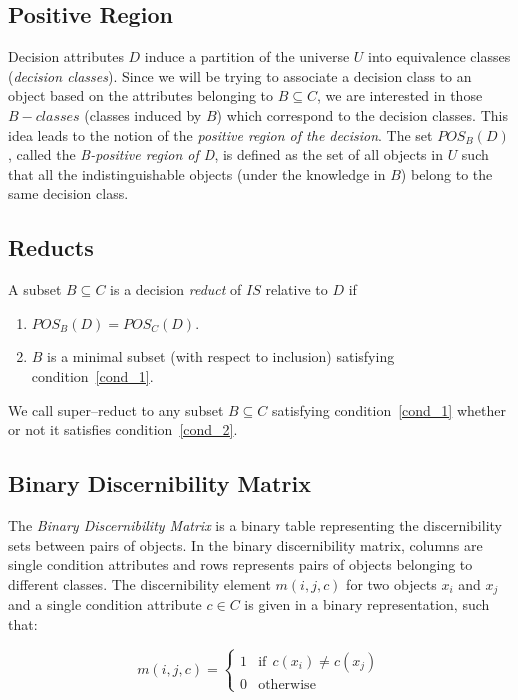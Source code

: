 \documentclass[number,preprint,review,12pt]{elsarticle}
\begin{document}
\subsection{Positive Region}\label{subsect_Pos}
  Decision attributes $D$ induce a partition of the universe $U$ into equivalence classes (\textit{decision classes}). Since we will be trying to associate a decision class to an object based on the attributes belonging to $B \subseteq C$, we are interested in those $B-classes$ (classes induced by $B$) which correspond to the decision classes. This idea leads to the notion of the  \textit{positive region of the decision}. The set $POS_B(D)$, called the \textit{B-positive region of D}, is defined as the set of all objects in $U$ such that all the indistinguishable objects (under the knowledge in $B$) belong to the same decision class.
 
\subsection{Reducts}\label{def_reduct}
  A subset $B \subseteq C$ is a decision \textit{reduct} of $IS$ relative to $D$ if
  \begin{enumerate}
  	\item $POS_B(D)=POS_C(D)$. \label{cond_1}
  	\item $B$ is a minimal subset (with respect to inclusion) satisfying condition~\ref{cond_1}.\label{cond_2}
  \end{enumerate}

  We call super--reduct to any subset $B \subseteq C$ satisfying condition~\ref{cond_1} whether or not it satisfies
  condition~\ref{cond_2}.
  
%  
\subsection{Binary Discernibility Matrix}
  The \textit{Binary Discernibility Matrix} is a binary table representing the discernibility sets between pairs 
  of objects. In the binary discernibility matrix, columns are single condition attributes and rows represents pairs of objects belonging to different classes. The discernibility element $m(i, j, c)$ for two objects $x_i$ and $x_j$ and a single condition attribute $c \in C$ is given in a binary representation, such that:
  
  \begin{equation}
  	m(i, j, c)=\left\lbrace\begin{array}{cl}
  			1 & \mathrm{if~~}c(x_i) \neq c(x_j) \\
  			0 								   & \mathrm{otherwise} 
  	\end{array}\right.
  \end{equation} 
  
\end{document}
